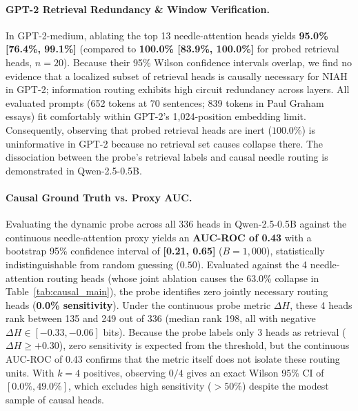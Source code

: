 \documentclass[11pt]{article}
\begin{document}
\paragraph{GPT-2 Retrieval Redundancy \& Window Verification.}
In GPT-2-medium, ablating the top 13 needle-attention heads yields \textbf{95.0\% [76.4\%, 99.1\%]} (compared to \textbf{100.0\% [83.9\%, 100.0\%]} for probed retrieval heads, $n=20$). Because their 95\% Wilson confidence intervals overlap, we find no evidence that a localized subset of retrieval heads is causally necessary for NIAH in GPT-2; information routing exhibits high circuit redundancy across layers. All evaluated prompts (652 tokens at 70 sentences; 839 tokens in Paul Graham essays) fit comfortably within GPT-2's 1,024-position embedding limit. Consequently, observing that probed retrieval heads are inert ($100.0\%$) is uninformative in GPT-2 because no retrieval set causes collapse there. The dissociation between the probe's retrieval labels and causal needle routing is demonstrated in Qwen-2.5-0.5B.

\paragraph{Causal Ground Truth vs. Proxy AUC.}
Evaluating the dynamic probe across all 336 heads in Qwen-2.5-0.5B against the continuous needle-attention proxy yields an \textbf{AUC-ROC of 0.43} with a bootstrap 95\% confidence interval of \textbf{[0.21, 0.65]} ($B=1,000$), statistically indistinguishable from random guessing ($0.50$). Evaluated against the 4 needle-attention routing heads (whose joint ablation causes the 63.0\% collapse in Table~\ref{tab:causal_main}), the probe identifies zero jointly necessary routing heads (\textbf{0.0\% sensitivity}). Under the continuous probe metric $\Delta H$, these 4 heads rank between 135 and 249 out of 336 (median rank 198, all with negative $\Delta H \in [-0.33, -0.06]$ bits). Because the probe labels only 3 heads as retrieval ($\Delta H \ge +0.30$), zero sensitivity is expected from the threshold, but the continuous AUC-ROC of 0.43 confirms that the metric itself does not isolate these routing units. With $k=4$ positives, observing $0/4$ gives an exact Wilson 95\% CI of $[0.0\%, 49.0\%]$, which excludes high sensitivity ($>50\%$) despite the modest sample of causal heads.
\end{document}
